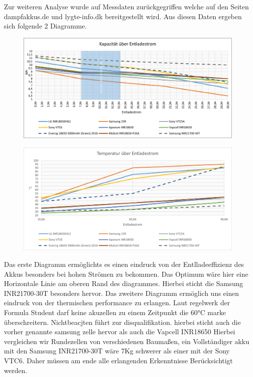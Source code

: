 Zur weiteren Analyse wurde auf Messdaten zurückgegriffen welche auf den Seiten dampfakkus.de und lygte-info.dk bereitgestellt wird. Aus diesen Daten ergeben sich folgende 2 Diagramme.
\begin{figure}[h]
	\centering
	\includegraphics[width=0.6\linewidth]{bilder/Kapazitaet_ueber_Entladestrom}
	\caption{}
	\label{fig:Kapazitaet_ueber_Entladestrom}
\end{figure}
\begin{figure}[h]
	\centering
	\includegraphics[width=0.6\linewidth]{bilder/Temperatur_ueber_Entladestrom}
	\caption{}
	\label{fig:Temperatur_ueber_Entladestrom}
\end{figure}
Das erste Diagramm ermöglichts es einen eindruck von der Entlladeeffizienz des Akkus besonders bei hohen Strömen zu bekommen. Das Optimum wäre hier eine Horizontale Linie am oberen Rand des diagrammes. Hierbei sticht die Samsung INR21700-30T besonders hervor.
Das zweitere Diagramm ermöglich uns einen eindruck von der thermischen performance zu erlangen. Laut regelwerk der Formula Student darf keine akuzellen zu einem Zeitpunkt die 60°C marke überschreitern. Nichtbeacjten führt zur disqualifikation. hierbei sticht auch die vorher genannte samsung zelle hervor als auch die Vapcell INR18650
Hierbei vergleichen wir Rundezellen von verschiedenen Baumaßen, ein Vollständiger akku mit den Samsung INR21700-30T wäre 7Kg schwerer als einer mit der Sony VTC6. Daher müssen am ende alle erlangenden Erkenntnisse Berücksichtigt werden.

\FloatBarrier
